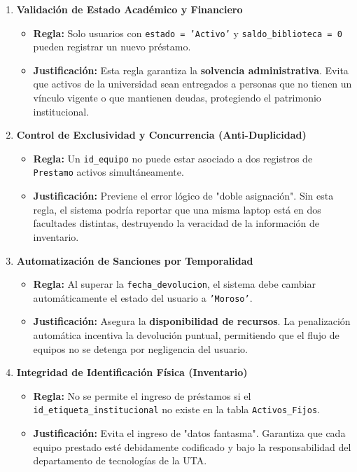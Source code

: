 \documentclass{article}
\begin{document}
\begin{enumerate}
    \item \textbf{Validación de Estado Académico y Financiero}
    \begin{itemize}
        \item \textbf{Regla:} Solo usuarios con \texttt{estado = 'Activo'} y \texttt{saldo\_biblioteca = 0} pueden registrar un nuevo préstamo.
        \item \textbf{Justificación:} Esta regla garantiza la \textbf{solvencia administrativa}. Evita que activos de la universidad sean entregados a personas que no tienen un vínculo vigente o que mantienen deudas, protegiendo el patrimonio institucional.
    \end{itemize}

    \item \textbf{Control de Exclusividad y Concurrencia (Anti-Duplicidad)}
    \begin{itemize}
        \item \textbf{Regla:} Un \texttt{id\_equipo} no puede estar asociado a dos registros de \texttt{Prestamo} activos simultáneamente.
        \item \textbf{Justificación:} Previene el error lógico de "doble asignación". Sin esta regla, el sistema podría reportar que una misma laptop está en dos facultades distintas, destruyendo la veracidad de la información de inventario.
    \end{itemize}

    \item \textbf{Automatización de Sanciones por Temporalidad}
    \begin{itemize}
        \item \textbf{Regla:} Al superar la \texttt{fecha\_devolucion}, el sistema debe cambiar automáticamente el estado del usuario a \texttt{'Moroso'}.
        \item \textbf{Justificación:} Asegura la \textbf{disponibilidad de recursos}. La penalización automática incentiva la devolución puntual, permitiendo que el flujo de equipos no se detenga por negligencia del usuario.
    \end{itemize}

    \item \textbf{Integridad de Identificación Física (Inventario)}
    \begin{itemize}
        \item \textbf{Regla:} No se permite el ingreso de préstamos si el \texttt{id\_etiqueta\_institucional} no existe en la tabla \texttt{Activos\_Fijos}.
        \item \textbf{Justificación:} Evita el ingreso de "datos fantasma". Garantiza que cada equipo prestado esté debidamente codificado y bajo la responsabilidad del departamento de tecnologías de la UTA.
    \end{itemize}


\end{enumerate}
\end{document}
